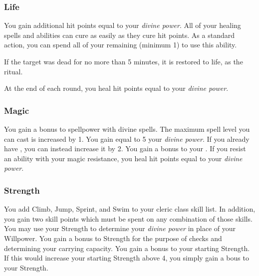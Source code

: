         \subsubsection{Life}
             You gain additional hit points equal to your \textit{divine power}.
             All of your healing spells and abilities can cure  as easily as they cure hit points.
             As a standard action, you can spend all of your remaining  (minimum 1) to use this ability.
            \begin{ability}
                \begin{spelltargetinginfo}
                \end{spelltargetinginfo}
                \begin{spelleffects}
                    \spelleffect If the target was dead for no more than 5 minutes, it is restored to life, as the  ritual.
                \end{spelleffects}
            \end{ability}
             At the end of each round, you heal hit points equal to your \textit{divine power}.

        \subsubsection{Magic}
             You gain a  bonus to spellpower with divine spells.
             The maximum spell level you can cast is increased by 1.
             You gain  equal to 5 \add your \textit{divine power}.
            If you already have , you can instead increase it by 2.
             You gain a  bonus to your .
            If you resist an ability with your magic resistance, you heal hit points equal to your \textit{divine power}.

        \subsubsection{Strength}
             You add Climb, Jump, Sprint, and Swim to your cleric class skill list.
            In addition, you gain two skill points which must be spent on any combination of those skills.
             You may use your Strength to determine your \textit{divine power} in place of your Willpower.
             You gain a  bonus to Strength for the purpose of checks and determining your carrying capacity.
             You gain a  bonus to your starting Strength.
            If this would increase your starting Strength above 4, you simply gain a  bous to your Strength.


